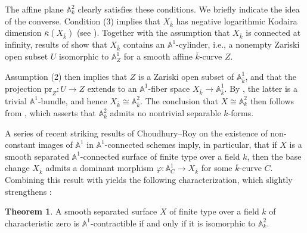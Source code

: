 \documentclass[10pt]{amsart}
\renewcommand{\AA}{\mathbb{A}}
\numberwithin{equation}{section} %
\theoremstyle{plain}
\theoremstyle{definition}
\newtheorem{theorem}[theorem]{Theorem}
\theoremstyle{remark}
\begin{document}
The affine plane $\AA^2_k$ clearly satisfies these conditions. We briefly indicate the idea of the converse. Condition (3) implies that $X_{\bar{k}}$ has negative logarithmic Kodaira dimension $\bar{\kappa}(X_{\bar{k}})$ (see \cite{iitaka1977logarithmic,russell1981affine}). Together with the assumption that $X_{\bar{k}}$ is connected at infinity, results of \cite{miyanishi1980affine,russell1981affine} show that $X_{\bar{k}}$ contains an $\AA^1$-cylinder, i.e., a nonempty Zariski open subset $U$ isomorphic to $\AA^1_Z$ for a smooth affine $\bar{k}$-curve $Z$. 

Assumption (2) then implies that $Z$ is a Zariski open subset of $\AA^1_{\bar{k}}$, and that the projection $\mathrm{pr}_Z:U\to Z$ extends to an $\AA^1$-fiber space $X_{\bar{k}}\to \AA^1_{\bar{k}}$. By , the latter is a trivial $\AA^1$-bundle, and hence $X_{\bar{k}}\cong \AA^2_{\bar{k}}$. The conclusion that $X\cong \AA^2_k$ then follows from \cite{kambayashi1975absence}, which asserts that $\AA^2_k$ admits no nontrivial separable $k$-forms.



\medskip

A series of recent striking results of Choudhury--Roy \cite{choudhury2024, ChRoy26} on the existence of non-constant images of $\AA^1$ in $\AA^1$-connected schemes imply, in particular, that if $X$ is a smooth separated $\AA^1$-connected surface of finite type over a field $k$, then the base change $X_{\bar{k}}$ admits a dominant morphism $\varphi:\AA^1_C\to X_{\bar{k}}$ for some $\bar{k}$-curve $C$. Combining this result with  yields the following characterization, which slightly strengthens \cite[Theorem~1.1]{choudhury2024}:

\begin{theorem}\label{A2isunique}\label{A2isunique-gen}
A smooth separated surface $X$ of finite type over a field $k$ of characteristic zero is $\AA^1$-contractible if and only if it is isomorphic to $\AA^2_k$.
\end{theorem}
\end{document}
